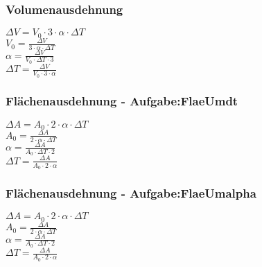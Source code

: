 \subsubsection{Volumenausdehnung} 
\begin{minipage}{0.45\textwidth} 
$ \Delta V = V_{0} \cdot 3\cdot \alpha \cdot \Delta T $\\ 
$ V_{0}  = \frac{  \Delta V}{3\cdot \alpha \cdot \Delta T} $\\ 
$ \alpha  = \frac{  \Delta V}{V_{0} \cdot \Delta T\cdot 3} $\\ 
$ \Delta T = \frac{  \Delta V}{V_{0} \cdot 3\cdot \alpha } $\\ 
\end{minipage} 
\begin{minipage}{0.45\textwidth} 
 
\end{minipage} 
\subsubsection{Flächenausdehnung - Aufgabe:FlaeUmdt} 
\begin{minipage}{0.45\textwidth} 
$ \Delta A = A_{0} \cdot 2\cdot \alpha \cdot \Delta T $\\ 
$ A_{0}  = \frac{ \Delta A}{2\cdot \alpha \cdot \Delta T} $\\ 
$ \alpha  = \frac{ \Delta A}{A_{0} \cdot \Delta T\cdot 2} $\\ 
$ \Delta T = \frac{ \Delta A}{A_{0} \cdot 2\cdot \alpha } $\\ 
\end{minipage} 
\begin{minipage}{0.45\textwidth} 
 
\end{minipage} 
\subsubsection{Flächenausdehnung - Aufgabe:FlaeUmalpha} 
\begin{minipage}{0.45\textwidth} 
$ \Delta A = A_{0} \cdot 2\cdot \alpha \cdot \Delta T $\\ 
$ A_{0}  = \frac{ \Delta A}{2\cdot \alpha \cdot \Delta T} $\\ 
$ \alpha  = \frac{ \Delta A}{A_{0} \cdot \Delta T\cdot 2} $\\ 
$ \Delta T = \frac{ \Delta A}{A_{0} \cdot 2\cdot \alpha } $\\ 
\end{minipage} 
\begin{minipage}{0.45\textwidth} 
 
\end{minipage} 
